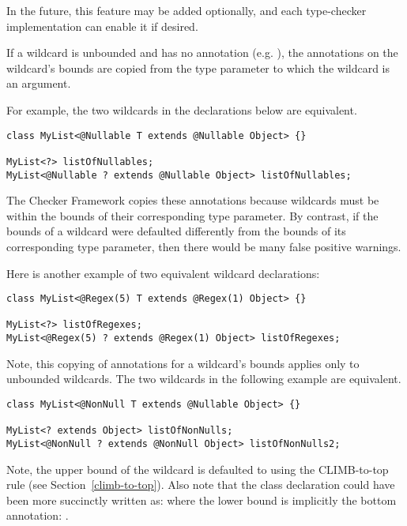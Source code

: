 In the future, this feature may be added optionally, and each type-checker
implementation can enable it if desired.



If a wildcard is unbounded and has no annotation (e.g. ),
the annotations on the wildcard's bounds are copied from the type parameter
to which the wildcard is an argument.

For example, the two wildcards in
the declarations below are equivalent.

\begin{Verbatim}
class MyList<@Nullable T extends @Nullable Object> {}

MyList<?> listOfNullables;
MyList<@Nullable ? extends @Nullable Object> listOfNullables;
\end{Verbatim}

The Checker Framework copies
these annotations because wildcards must be within the bounds of their
corresponding type parameter.
By contrast, if the bounds of a wildcard
were defaulted differently from the bounds of its corresponding type
parameter, then there would be many false positive
 warnings.

Here is another example of two equivalent wildcard declarations:

\begin{Verbatim}
class MyList<@Regex(5) T extends @Regex(1) Object> {}

MyList<?> listOfRegexes;
MyList<@Regex(5) ? extends @Regex(1) Object> listOfRegexes;
\end{Verbatim}

Note, this copying of annotations for a wildcard's bounds applies only to
unbounded wildcards.  The two wildcards in the
following example are equivalent.

\begin{Verbatim}
class MyList<@NonNull T extends @Nullable Object> {}

MyList<? extends Object> listOfNonNulls;
MyList<@NonNull ? extends @NonNull Object> listOfNonNulls2;
\end{Verbatim}

Note, the upper bound of the wildcard  is defaulted to
 using the CLIMB-to-top rule (see Section~\ref{climb-to-top}).
Also note that the  class declaration could have been more succinctly
written as:  where the lower bound
is implicitly the bottom annotation: .

